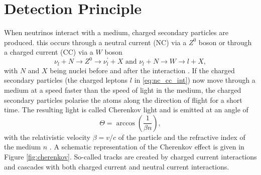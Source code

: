 \section{Detection Principle}

When neutrinos interact with a medium, charged secondary particles are produced.
this occurs through a neutral current (NC) via a $Z^0$ boson or through a charged current (CC) via a $W$ boson
\begin{equation}
  \nu_l + N \rightarrow Z^0 \rightarrow \nu^{\prime}_l + X \text{ and }  \nu_l + N \rightarrow W \rightarrow l + X, \label{eq:nc_cc_int}
\end{equation}
with $N$ and $X$ being nuclei before and after the interaction \cite{Ahlers_2018}.
If the charged secondary particles (the charged leptons $l$ in \eqref{eq:nc_cc_int}) now move through a medium at a speed faster than the speed of light in the medium, the charged secondary particles polarise the atoms along the direction of flight for a short time.
The resulting light is called Cherenkov light and is emitted at an angle of
\begin{equation}
  \Theta = \arccos{\left(\frac{1}{\beta n}\right)}, \label{eq:cherenkov}
\end{equation}
with the relativistic velocity $\beta=v/c$ of the particle and the refractive index of the medium $n$ \cite{PhysRev52378} \cite{spiering}.
A schematic representation of the Cherenkov effect is given in Figure \ref{fig:cherenkov}.
So-called tracks are created by charged current interactions and cascades with both charged current and neutral current interactions.
